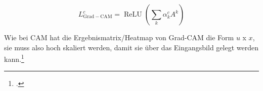 \begin{equation}
    \label{eq:grad_cam_rel}
    L_{\mathrm{Grad-CAM}}^{c}=\operatorname{ReLU}\left(\sum_{k} \alpha_{k}^{c} A^{k}\right)
\end{equation}

Wie bei \ac{CAM} hat die Ergebnismatrix/Heatmap von Grad-\ac{CAM} die Form $u$ x $x$, sie muss also hoch skaliert werden, damit sie über das Eingangsbild gelegt werden kann.\footcite[Vgl.][S. 4-6]{selvarajuGradCAM2020}


